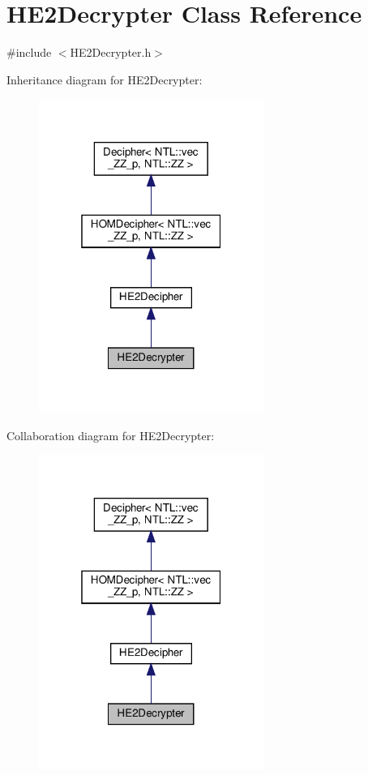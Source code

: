 \hypertarget{classHE2Decrypter}{}\section{H\+E2\+Decrypter Class Reference}
\label{classHE2Decrypter}


{\ttfamily \#include $<$H\+E2\+Decrypter.\+h$>$}



Inheritance diagram for H\+E2\+Decrypter\+:\nopagebreak
\begin{figure}[H]
\begin{center}
\leavevmode
\includegraphics[width=208pt]{classHE2Decrypter__inherit__graph}
\end{center}
\end{figure}


Collaboration diagram for H\+E2\+Decrypter\+:\nopagebreak
\begin{figure}[H]
\begin{center}
\leavevmode
\includegraphics[width=208pt]{classHE2Decrypter__coll__graph}
\end{center}
\end{figure}
